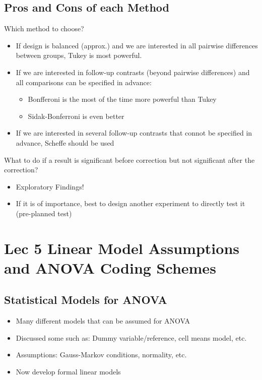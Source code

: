 \documentclass[a4paper,11pt]{article}
\begin{document}
\subsection{Pros and Cons of each Method}
Which method to choose? 
\begin{itemize}
\item If design is balanced (approx.) and we are interested in all pairwise differences between groups, Tukey is most powerful. 
\item If we are interested in follow-up contrasts (beyond pairwise differences) and all comparisons can be specified in advance: 
\begin{itemize}
\item Bonfferoni is the most of the time more powerful than Tukey
\item Sidak-Bonferroni is even better
\end{itemize}
\item If we are interested in several follow-up contrasts that connot be specified in advance, Scheffe should be used
\end{itemize}
What to do if a result is significant before correction but not significant after the correction?
\begin{itemize}
\item Exploratory Findings!
\item If it is of importance, best to design another experiment to directly test it (pre-planned test)
\end{itemize}

\section{Lec 5 Linear Model Assumptions and ANOVA Coding Schemes}
\subsection{Statistical Models for ANOVA}
\begin{itemize}
\item Many different models that can be assumed for ANOVA
\item Discussed some such as: Dummy variable/reference, cell means model, etc.
\item Assumptions: Gauss-Markov conditions, normality, etc. 
\item Now develop formal linear models
\end{itemize}
\end{document}
